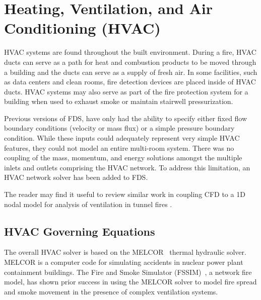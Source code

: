 \chapter{Heating, Ventilation, and Air Conditioning (HVAC)}

HVAC systems are found throughout the built environment.  During a fire, HVAC ducts can serve as a path for heat and combustion products to be moved through a building and the ducts can serve as a supply of fresh air.  In some facilities, such as data centers and clean rooms, fire detection devices are placed inside of HVAC ducts. HVAC systems may also serve as part of the fire protection system for a building when used to exhaust smoke or maintain stairwell pressurization.

Previous versions of FDS, have only had the ability to specify either fixed flow boundary conditions (velocity or mass flux) or a simple pressure boundary condition. While these inputs could adequately represent very simple HVAC features, they could not model an entire multi-room system.
There was no coupling of the mass, momentum, and energy solutions amongst the multiple inlets and outlets comprising the HVAC network.
To address this limitation, an HVAC network solver has been added to FDS.

The reader may find it useful to review similar work in coupling CFD to a 1D nodal model for analysis of ventilation in tunnel fires \cite{Colella:2010, Colella:2011}.


\section{HVAC Governing Equations}

The overall HVAC solver is based on the MELCOR~\cite{MELCOR} thermal hydraulic solver.  MELCOR is a computer code for simulating accidents in nuclear power plant containment buildings.
The Fire and Smoke Simulator (FSSIM)~\cite{FSSIM}, a network fire model, has shown prior success in using the MELCOR solver to model fire spread and smoke movement
in the presence of complex ventilation systems.

